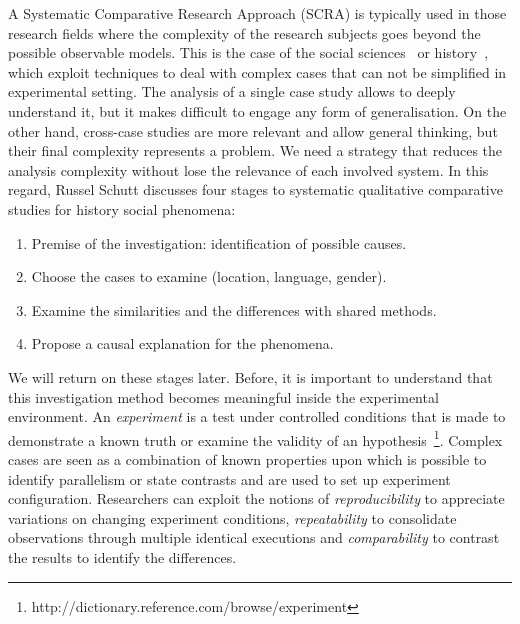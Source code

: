 A Systematic Comparative Research Approach (SCRA) is typically used in those research fields where the complexity of the research subjects goes beyond the possible observable models. This is the case of the social sciences~\cite{felsenstein1985phylogenies} or history~\cite{CSS:4411600}, which exploit techniques to deal with complex cases that can not be simplified in experimental setting. The analysis of a single case study allows to deeply understand it, but it makes difficult to engage any form of generalisation. On the other hand, cross-case studies are more relevant and allow general thinking, but their final complexity represents a problem. We need a strategy that reduces the analysis complexity without lose the relevance of each involved system. In this regard, Russel Schutt discusses four stages to systematic qualitative comparative studies for history social phenomena:
\begin{enumerate}
\item[S.1] Premise of the investigation: identification of possible causes.
\item[S.2] Choose the cases to examine (location, language, gender).
\item[S.3] Examine the similarities and the differences with shared methods.
\item[S.4] Propose a causal explanation for the phenomena.
\end{enumerate}

We will return on these stages later. Before, it is important to understand that this investigation method becomes meaningful inside the experimental environment. An \textit{experiment} is a test under controlled conditions that is made to demonstrate a known truth or examine the validity of an hypothesis~\footnote{http://dictionary.reference.com/browse/experiment}. Complex cases are seen as a combination of known properties upon which is possible to identify parallelism or state contrasts and are used to set up experiment configuration. Researchers can exploit the notions of \textit{reproducibility} to appreciate variations on changing experiment conditions, \textit{repeatability} to consolidate observations through multiple identical executions and \textit{comparability} to contrast the results to identify the differences.


